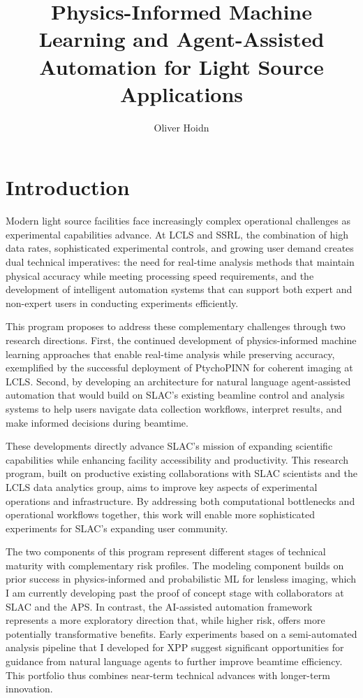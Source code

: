 \documentclass{article}
\title{Physics-Informed Machine Learning and Agent-Assisted Automation for Light Source Applications}
\author{Oliver Hoidn} %
\date{}
\begin{document}
\maketitle

\section*{Introduction}
Modern light source facilities face increasingly complex operational challenges as experimental capabilities advance. At LCLS and SSRL, the combination of high data rates, sophisticated experimental controls, and growing user demand creates dual technical imperatives: the need for real-time analysis methods that maintain physical accuracy while meeting processing speed requirements, and the development of intelligent automation systems that can support both expert and non-expert users in conducting experiments efficiently.

This program proposes to address these complementary challenges through two research directions. First, the continued development of physics-informed machine learning approaches that enable real-time analysis while preserving accuracy, exemplified by the successful deployment of PtychoPINN for coherent imaging at LCLS. Second, by developing an architecture for natural language agent-assisted automation that would build on SLAC's existing beamline control and analysis systems to help users navigate data collection workflows, interpret results, and make informed decisions during beamtime.


These developments directly advance SLAC's mission of expanding scientific capabilities while enhancing facility accessibility and productivity. This research program, built on productive existing collaborations with SLAC scientists and the LCLS data analytics group, aims to improve key aspects of experimental operations and infrastructure. By addressing both computational bottlenecks and operational workflows together, this work will enable more sophisticated experiments for SLAC's expanding user community.

The two components of this program represent different stages of technical maturity with complementary risk profiles. The modeling component builds on prior success in physics-informed and probabilistic ML for lensless imaging, which I am currently developing past the proof of concept stage with collaborators at SLAC and the APS. In contrast, the AI-assisted automation framework represents a more exploratory direction that, while higher risk, offers more potentially transformative benefits. Early experiments based on a semi-automated analysis pipeline that I developed for XPP suggest significant opportunities for guidance from natural language agents to further improve beamtime efficiency. This portfolio thus combines near-term technical advances with longer-term innovation.
\end{document}
